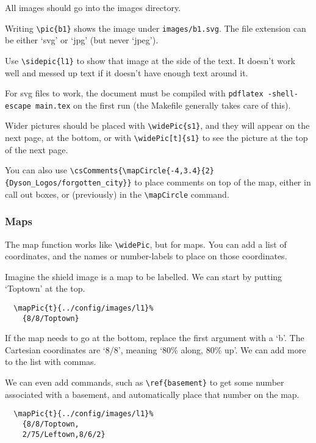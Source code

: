 \documentclass[a4paper,openany]{book}
\begin{document}
\begin{multicols}{2}
All images should go into the images directory.

Writing \verb"\pic{b1}" shows the image under \verb"images/b1.svg".
The file extension can be either `svg' or `jpg' (but never `jpeg').

Use \verb"\sidepic{l1}" to show that image at the side of the text.
It doesn't work well and messed up text if it doesn't have enough text around it.


For svg files to work, the document must be compiled with \verb"pdflatex -shell-escape main.tex" on the first run (the Makefile generally takes care of this).

Wider pictures should be placed with \verb"\widePic{s1}", and they will appear on the next page, at the bottom, or with \verb"\widePic[t]{s1}" to see the picture at the top of the next page.


You can also use \verb"\csComments{\mapCircle{-4,3.4}{2}{Dyson_Logos/forgotten_city}}" to place comments on top of the map, either in call out boxes, or (previously) in the \verb"\mapCircle" command.

\subsubsection{Maps}

The map function works like \verb"\widePic", but for maps.
You can add a list of coordinates, and the names or number-labels to place on those coordinates.


Imagine the shield image is a map to be labelled.
We can start by putting `Toptown' at the top.

\begin{verbatim}
  \mapPic{t}{../config/images/l1}%
    {8/8/Toptown}
\end{verbatim}

If the map needs to go at the bottom, replace the first argument with a `b'.
The Cartesian coordinates are `8/8', meaning `80\% along, 80\% up'.
We can add more to the list with commas.

We can even add commands, such as \verb"\ref{basement}" to get some number associated with a basement, and automatically place that number on the map.

\begin{verbatim}
  \mapPic{t}{../config/images/l1}%
    {8/8/Toptown,
    2/75/Leftown,8/6/2}
\end{verbatim}


\end{multicols}
\end{document}

